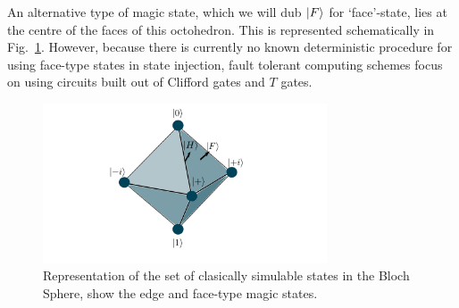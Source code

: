 \documentclass{standalone}
\begin{document}
\par
An alternative type of magic state, which we will dub $\ket{F}$ for `face'-state, lies at the centre of the faces of this octohedron. This is represented schematically in Fig.~\ref{fig:octohedron}. However, because there is currently no known deterministic procedure for using face-type states in state injection, fault tolerant computing schemes focus on using circuits built out of Clifford gates and $T$ gates.
\par
\begin{figure}[h]
    \centering
    \includegraphics[width=0.75\textwidth]{Figures/octohedron.pdf}
\caption{Representation of the set of clasically simulable states in the Bloch Sphere, show the edge and face-type magic states.}
\label{fig:octohedron}
\end{figure}
\end{document}

